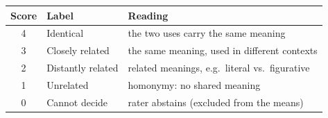 \begin{tabular}{@{}cll@{}}
\toprule
Score & Label & Reading \\
\midrule
4 & Identical & the two uses carry the same meaning \\
3 & Closely related & the same meaning, used in different contexts \\
2 & Distantly related & related meanings, e.g.\ literal vs.\ figurative \\
1 & Unrelated & homonymy: no shared meaning \\
0 & Cannot decide & rater abstains (excluded from the means) \\
\bottomrule
\end{tabular}